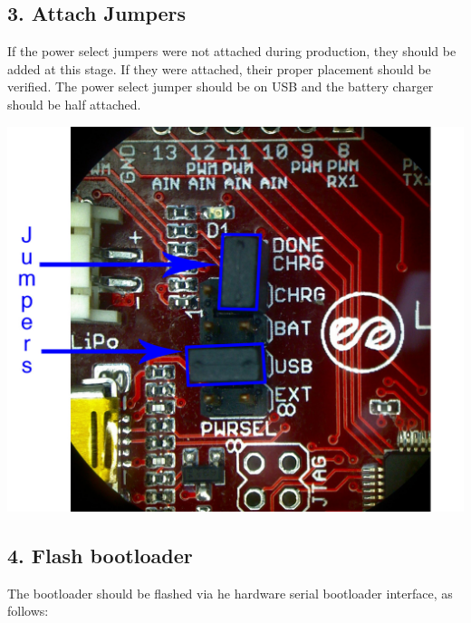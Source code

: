 \documentclass[a4paper,12pt]{report}
\begin{document}
\subsection*{3. Attach Jumpers}

If the power select jumpers were not attached during production, they should be added at this stage. If they were attached, their proper placement should be verified. The power select jumper should be on USB and the battery charger should be half attached.


\begin{center}
\includegraphics[width=.8\linewidth]{jumpers}
\end{center}

\clearpage
\subsection*{4. Flash bootloader}
The bootloader should be flashed via he hardware serial bootloader interface, as follows:
\end{document}
